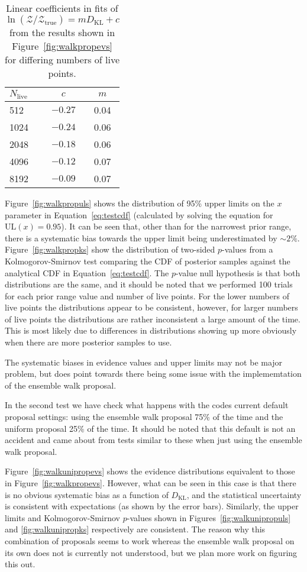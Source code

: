 \begin{table}[h]
\caption{Linear coefficients in fits of $\ln{(\mathcal{Z}/\mathcal{Z}_{\text{true}})} = mD_{\text{KL}} + c$ from the results
shown in Figure~\ref{fig:walkpropevs} for differing numbers of live points.\label{tab:klvsz}}
\begin{center}
\begin{tabular}{l c c}
\hline
\hline
$N_{\text{live}}$ & $c$ & $m$ \\
\hline
512 & $-0.27$ & 0.04 \\
1024 & $-0.24$ & 0.06 \\
2048 & $-0.18$ & 0.06 \\
4096 & $-0.12$ & 0.07 \\
8192 & $-0.09$ & 0.07 \\
\hline
\end{tabular}
\end{center}
\end{table}

Figure~\ref{fig:walkpropuls} shows the distribution of 95\% upper limits on the $x$ parameter in Equation~\ref{eq:testcdf} (calculated by solving
the equation for $\text{UL}(x) = 0.95$). It can be seen that, other than for the narrowest prior range, there is a systematic bias towards the
upper limit being underestimated by $\sim 2\%$. Figure~\ref{fig:walkpropks} show the distribution of two-sided $p$-values from a Kolmogorov-Smirnov
test comparing the CDF of posterior samples against the analytical CDF in Equation~\ref{eq:testcdf}. The $p$-value null hypothesis is that both
distributions are the same, and it should be noted that we performed 100 trials for each prior range value and number of live points. For the
lower numbers of live points the distributions appear to be consistent, however, for larger numbers of live points the distributions are rather
inconsistent a large amount of the time. This is most likely due to differences in distributions showing up more obviously when there are more
posterior samples to use.

The systematic biases in evidence values and upper limits may not be major problem, but does point towards there being some issue with the
implememtation of the ensemble walk proposal.

In the second test we have check what happens with the codes current default proposal settings: using the ensemble walk proposal 75\%
of the time and the uniform proposal 25\% of the time. It should be noted that this default is not an accident and came about from tests
similar to these when just using the ensemble walk proposal.

Figure~\ref{fig:walkunipropevs} shows the evidence distributions equivalent to those in Figure~\ref{fig:walkpropevs}. However, what can
be seen in this case is that there is no obvious systematic bias as a function of $D_{\text{KL}}$, and the statistical uncertainty is
consistent with expectations (as shown by the error bars). Similarly, the upper limits and Kolmogorov-Smirnov $p$-values shown in
Figures~\ref{fig:walkunipropuls} and \ref{fig:walkunipropks} respectively are consistent. The reason why this combination of proposals
seems to work whereas the ensemble walk proposal on its own does not is currently not understood, but we plan more work on figuring this
out.